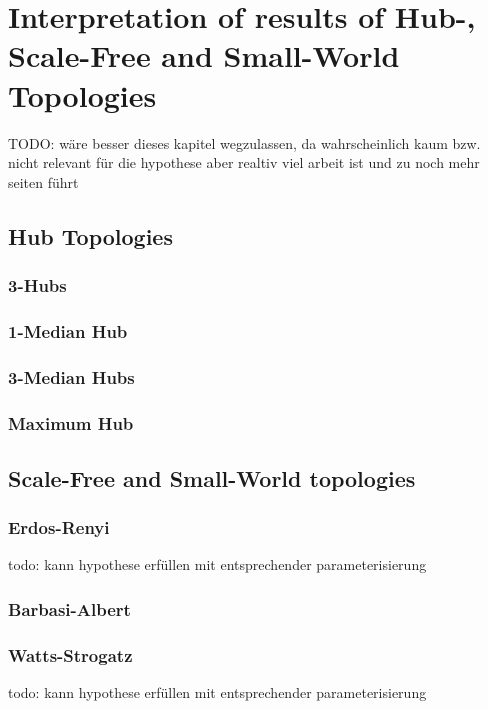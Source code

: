 \documentclass[Bachelorarbeit.tex]{subfiles}
\begin{document}
\chapter{Interpretation of results of Hub-, Scale-Free and Small-World Topologies}
\label{app:interpretation}

TODO: wäre besser dieses kapitel wegzulassen, da wahrscheinlich kaum bzw. nicht relevant für die hypothese aber realtiv viel arbeit ist und zu noch mehr seiten führt

\section{Hub Topologies}
\subsection{3-Hubs}
\subsection{1-Median Hub}
\subsection{3-Median Hubs}
\subsection{Maximum Hub}

\section{Scale-Free and Small-World topologies}
\subsection{Erdos-Renyi}
todo: kann hypothese erfüllen mit entsprechender parameterisierung
\subsection{Barbasi-Albert}
\subsection{Watts-Strogatz}
todo: kann hypothese erfüllen mit entsprechender parameterisierung
\end{document}
